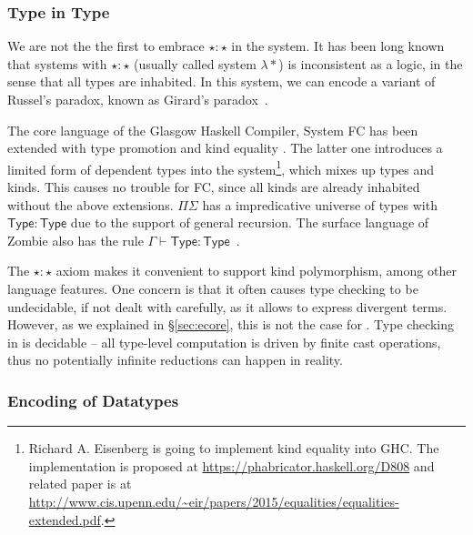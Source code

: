\subsubsection{Type in Type}

We are not the the first to embrace $\star : \star$ in the system. It
has been long known that systems with $\star : \star$ (usually called
system $\lambda *$) is inconsistent as a logic, in the sense that all
types are inhabited. In this system, we can encode a variant of
Russel's paradox, known as Girard's
paradox~\cite{coquand1986analysis}.

The core language of the Glasgow Haskell Compiler, System FC \cite{fc}
has been extended with type promotion \cite{fc:pro} and kind equality
\cite{fc:kind}. The latter one introduces a limited form of dependent
types into the system\footnote{Richard A. Eisenberg is going to
  implement kind equality \cite{fc:kind} into GHC. The implementation
  is proposed at \url{https://phabricator.haskell.org/D808} and
  related paper is at
  \url{http://www.cis.upenn.edu/~eir/papers/2015/equalities/equalities-extended.pdf}.},
which mixes up types and kinds. This causes no trouble for FC, since
all kinds are already inhabited without the above
extensions. $\Pi\Sigma$ has a impredicative universe of types with
$\mathsf{Type} : \mathsf{Type}$ due to the support of general
recursion. The surface language of Zombie also has the rule
$\Gamma \vdash \mathsf{Type} : \mathsf{Type}$~\cite{zombie:popl15}.

The $\star : \star$ axiom makes it convenient to support kind
polymorphism, among other language features. One concern is that it
often causes type checking to be undecidable, if not dealt with
carefully, as it allows to express divergent terms. However, as we
explained in \S\ref{sec:ecore}, this is not the case for \name. Type
checking in \name is decidable -- all type-level computation is driven
by finite cast operations, thus no potentially infinite reductions can
happen in reality.

\subsubsection{Encoding of Datatypes}

